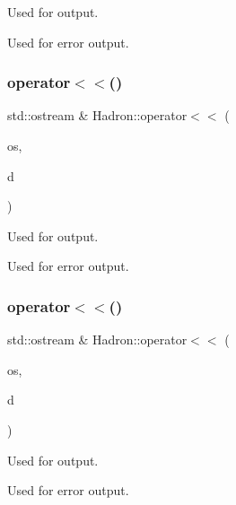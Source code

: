 Used for output. 

Used for error output. \mbox{\label{namespaceHadron_aa96f2bb0448730889b5e59a58a1a62dd}} 
\subsubsection{\texorpdfstring{operator$<$$<$()}{operator<<()}\hspace{0.1cm}{\footnotesize\ttfamily [5/48]}}
{\footnotesize\ttfamily std\+::ostream \& Hadron\+::operator$<$$<$ (\begin{DoxyParamCaption}\item[{std\+::ostream \&}]{os,  }\item[{const \mbox{\hyperlink{structHadron_1_1KeyHadronNPartNPtCorr__t_1_1NPoint__t}{Key\+Hadron\+N\+Part\+N\+Pt\+Corr\+\_\+t\+::\+N\+Point\+\_\+t}} \&}]{d }\end{DoxyParamCaption})}



Used for output. 

Used for error output. \mbox{\label{namespaceHadron_a2559588d0550564638289369a0d3ba30}} 
\subsubsection{\texorpdfstring{operator$<$$<$()}{operator<<()}\hspace{0.1cm}{\footnotesize\ttfamily [6/48]}}
{\footnotesize\ttfamily std\+::ostream \& Hadron\+::operator$<$$<$ (\begin{DoxyParamCaption}\item[{std\+::ostream \&}]{os,  }\item[{const \mbox{\hyperlink{structHadron_1_1KeyHadronSUNNPartNPtCorr__t_1_1NPoint__t}{Key\+Hadron\+S\+U\+N\+N\+Part\+N\+Pt\+Corr\+\_\+t\+::\+N\+Point\+\_\+t}} \&}]{d }\end{DoxyParamCaption})}



Used for output. 

Used for error output. \mbox{\label{namespaceHadron_a684b751246f1b7f63d5feafa97160408}} 
